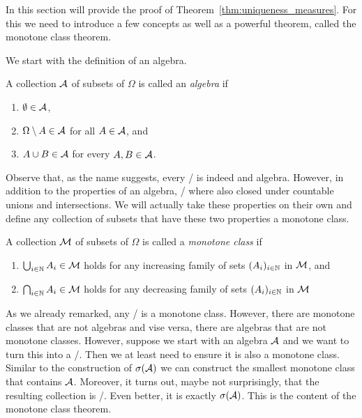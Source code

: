 
In this section will provide the proof of Theorem~\ref{thm:uniqueness_measures}. For this we need to introduce a few concepts as well as a powerful theorem, called the monotone class theorem.

We start with the definition of an algebra.

\begin{definition}
A collection $\mathcal A$ of subsets of $\Omega$ is called an \emph{algebra} if
\begin{enumerate}
\item $\emptyset \in \mathcal A$,
\item $\Omega \setminus A \in \mathcal A$ for all $A \in \mathcal A$, and
\item $A \cup B \in \mathcal A$ for every $A, B \in \mathcal A$.
\end{enumerate}
\end{definition}

Observe that, as the name suggests, every \sigalg/ is indeed and algebra. However, in addition to the properties of an algebra, \sigalgs/ where also closed under countable unions and intersections. We will actually take these properties on their own and define any collection of subsets that have these two properties a monotone class.

\begin{definition}
A collection $\mathcal M$ of subsets of $\Omega$ is called a \emph{monotone class} if
\begin{enumerate}
\item $\bigcup_{i \in \mathbb N} A_i \in \mathcal M$ holds for any increasing family of sets $(A_i)_{i \in \mathbb N}$ in $\mathcal M$, and
\item $\bigcap_{i \in \mathbb N} A_i \in \mathcal M$ holds for any decreasing family of sets $(A_i)_{i \in \mathbb N}$ in $\mathcal M$
\end{enumerate}
\end{definition}

As we already remarked, any \sigalg/ is a monotone class. However, there are monotone classes that are not algebras and vise versa, there are algebras that are not monotone classes. However, suppose we start with an algebra $\mathcal A$ and we want to turn this into a \sigalg/. Then we at least need to ensure it is also a monotone class. Similar to the construction of $\sigma(\mathcal A)$ we can construct the smallest monotone class that contains $\mathcal A$. Moreover, it turns out, maybe not surprisingly, that the resulting collection is \sigalg/. Even better, it is exactly $\sigma(\mathcal A)$. This is the content of the monotone class theorem. 

